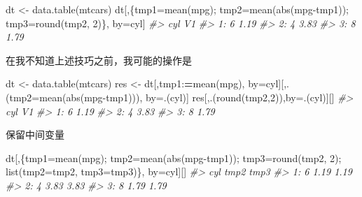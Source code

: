 \documentclass[
]{book}
\newenvironment{Shaded}{\begin{snugshade}}{\end{snugshade}}
\newcommand{\AttributeTok}[1]{\textcolor[rgb]{0.77,0.63,0.00}{#1}}
\newcommand{\CommentTok}[1]{\textcolor[rgb]{0.56,0.35,0.01}{\textit{#1}}}
\newcommand{\DecValTok}[1]{\textcolor[rgb]{0.00,0.00,0.81}{#1}}
\newcommand{\ErrorTok}[1]{\textcolor[rgb]{0.64,0.00,0.00}{\textbf{#1}}}
\newcommand{\FunctionTok}[1]{\textcolor[rgb]{0.00,0.00,0.00}{#1}}
\newcommand{\NormalTok}[1]{#1}
\newcommand{\OtherTok}[1]{\textcolor[rgb]{0.56,0.35,0.01}{#1}}
\newcommand{\SpecialCharTok}[1]{\textcolor[rgb]{0.00,0.00,0.00}{#1}}
\begin{document}
\begin{Shaded}
\begin{Highlighting}[]
\NormalTok{dt }\OtherTok{\textless{}{-}} \FunctionTok{data.table}\NormalTok{(mtcars)}
\NormalTok{dt[,\{tmp1}\OtherTok{=}\FunctionTok{mean}\NormalTok{(mpg); tmp2}\OtherTok{=}\FunctionTok{mean}\NormalTok{(}\FunctionTok{abs}\NormalTok{(mpg}\SpecialCharTok{{-}}\NormalTok{tmp1)); tmp3}\OtherTok{=}\FunctionTok{round}\NormalTok{(tmp2, }\DecValTok{2}\NormalTok{)\}, by}\OtherTok{=}\NormalTok{cyl]}
\CommentTok{\#\textgreater{}    cyl   V1}
\CommentTok{\#\textgreater{} 1:   6 1.19}
\CommentTok{\#\textgreater{} 2:   4 3.83}
\CommentTok{\#\textgreater{} 3:   8 1.79}
\end{Highlighting}
\end{Shaded}

在我不知道上述技巧之前，我可能的操作是

\begin{Shaded}
\begin{Highlighting}[]
\NormalTok{dt }\OtherTok{\textless{}{-}} \FunctionTok{data.table}\NormalTok{(mtcars)}
\NormalTok{res }\OtherTok{\textless{}{-}}\NormalTok{ dt[,tmp1}\SpecialCharTok{:}\ErrorTok{=}\FunctionTok{mean}\NormalTok{(mpg), by}\OtherTok{=}\NormalTok{cyl][,.(}\AttributeTok{tmp2=}\FunctionTok{mean}\NormalTok{(}\FunctionTok{abs}\NormalTok{(mpg}\SpecialCharTok{{-}}\NormalTok{tmp1))), by}\OtherTok{=}\NormalTok{.(cyl)]}
\NormalTok{res[,.(}\FunctionTok{round}\NormalTok{(tmp2,}\DecValTok{2}\NormalTok{)),by}\OtherTok{=}\NormalTok{.(cyl)][]}
\CommentTok{\#\textgreater{}    cyl   V1}
\CommentTok{\#\textgreater{} 1:   6 1.19}
\CommentTok{\#\textgreater{} 2:   4 3.83}
\CommentTok{\#\textgreater{} 3:   8 1.79}
\end{Highlighting}
\end{Shaded}

保留中间变量

\begin{Shaded}
\begin{Highlighting}[]
\NormalTok{dt[,\{tmp1}\OtherTok{=}\FunctionTok{mean}\NormalTok{(mpg); tmp2}\OtherTok{=}\FunctionTok{mean}\NormalTok{(}\FunctionTok{abs}\NormalTok{(mpg}\SpecialCharTok{{-}}\NormalTok{tmp1)); tmp3}\OtherTok{=}\FunctionTok{round}\NormalTok{(tmp2, }\DecValTok{2}\NormalTok{); }\FunctionTok{list}\NormalTok{(}\AttributeTok{tmp2=}\NormalTok{tmp2, }\AttributeTok{tmp3=}\NormalTok{tmp3)\}, by}\OtherTok{=}\NormalTok{cyl][]}
\CommentTok{\#\textgreater{}    cyl tmp2 tmp3}
\CommentTok{\#\textgreater{} 1:   6 1.19 1.19}
\CommentTok{\#\textgreater{} 2:   4 3.83 3.83}
\CommentTok{\#\textgreater{} 3:   8 1.79 1.79}
\end{Highlighting}
\end{Shaded}
\end{document}
